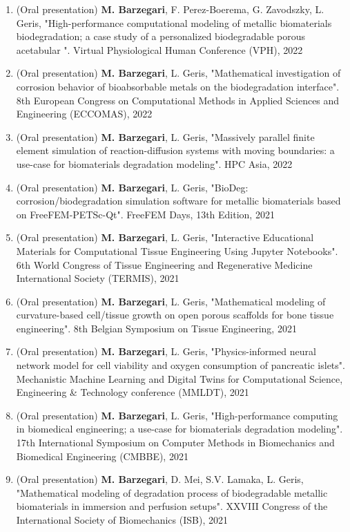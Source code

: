 \begin{enumerate}
\item
(Oral presentation) 
\textbf{M. Barzegari}, F. Perez-Boerema, G. Zavodszky, L. Geris, "High-performance computational modeling of metallic biomaterials biodegradation; a case study of a personalized biodegradable porous acetabular ". Virtual Physiological Human Conference (VPH), 2022
\item
(Oral presentation) 
\textbf{M. Barzegari}, L. Geris, "Mathematical investigation of corrosion behavior of bioabsorbable metals on the biodegradation interface". 8th European Congress on Computational Methods in Applied Sciences and Engineering (ECCOMAS), 2022
\item
(Oral presentation) 
\textbf{M. Barzegari}, L. Geris, "Massively parallel finite element simulation of reaction-diffusion systems with moving boundaries: a use-case for biomaterials degradation modeling". HPC Asia, 2022
\item
(Oral presentation) 
\textbf{M. Barzegari}, L. Geris, "BioDeg: corrosion/biodegradation simulation software for metallic biomaterials based on FreeFEM-PETSc-Qt". FreeFEM Days, 13th Edition, 2021
\item
(Oral presentation) 
\textbf{M. Barzegari}, L. Geris, "Interactive Educational Materials for Computational Tissue Engineering Using Jupyter Notebooks". 6th World Congress of Tissue Engineering and Regenerative Medicine International Society (TERMIS), 2021
\item
(Oral presentation) 
\textbf{M. Barzegari}, L. Geris, "Mathematical modeling of curvature-based cell/tissue growth on open porous scaffolds for bone tissue engineering". 8th Belgian Symposium on Tissue Engineering, 2021
\item
(Oral presentation)
\textbf{M. Barzegari}, L. Geris, "Physics-informed neural network model for cell viability and oxygen consumption of pancreatic islets". Mechanistic Machine Learning and Digital Twins for Computational Science, Engineering \& Technology conference (MMLDT), 2021
\item
(Oral presentation)
\textbf{M. Barzegari}, L. Geris, "High-performance computing in biomedical engineering; a use-case for biomaterials degradation modeling". 17th International Symposium on Computer Methods in Biomechanics and Biomedical Engineering (CMBBE), 2021
\item
(Oral presentation)
\textbf{M. Barzegari}, D. Mei, S.V. Lamaka, L. Geris, "Mathematical modeling of degradation process of biodegradable metallic biomaterials in immersion and perfusion setups". XXVIII Congress of the International Society of Biomechanics (ISB), 2021

\end{enumerate}
